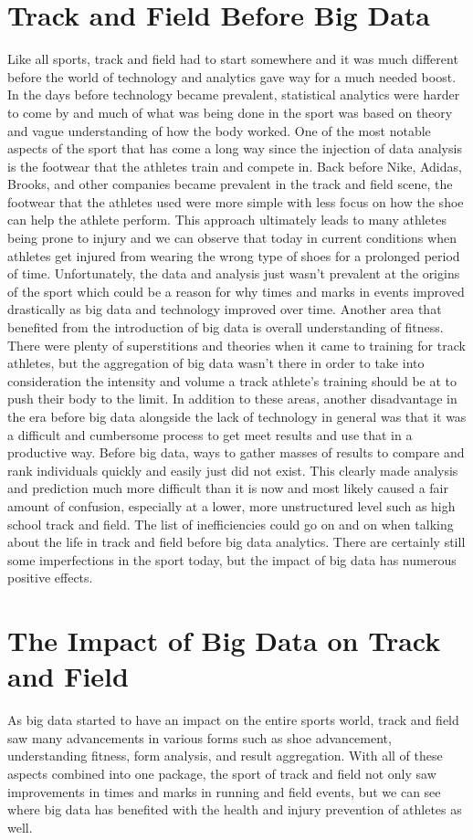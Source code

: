 \documentclass[sigconf]{acmart}
\begin{document}
\section{Track and Field Before Big Data}
Like all sports, track and field had to start somewhere and it was much different before the world of technology and analytics gave way for a much needed boost. In the days before technology became prevalent, statistical analytics were harder to come by and much of what was being done in the sport was based on theory and vague understanding of how the body worked. One of the most notable aspects of the sport that has come a long way since the injection of data analysis is the footwear that the athletes train and compete in. Back before Nike, Adidas, Brooks, and other companies became prevalent in the track and field scene, the footwear that the athletes used were more simple with less focus on how the shoe can help the athlete perform. This approach ultimately leads to many athletes being prone to injury and we can observe that today in current conditions when athletes get injured from wearing the wrong type of shoes for a prolonged period of time. Unfortunately, the data and analysis just wasn't prevalent at the origins of the sport which could be a reason for why times and marks in events improved drastically as big data and technology improved over time. Another area that benefited from the introduction of big data is overall understanding of fitness. There were plenty of superstitions and theories when it came to training for track athletes, but the aggregation of big data wasn't there in order to take into consideration the intensity and volume a track athlete's training should be at to push their body to the limit. In addition to these areas, another disadvantage in the era before big data alongside the lack of technology in general was that it was a difficult and cumbersome process to get meet results and use that in a productive way. Before big data, ways to gather masses of results to compare and rank individuals quickly and easily just did not exist. This clearly made analysis and prediction much more difficult than it is now and most likely caused a fair amount of confusion, especially at a lower, more unstructured level such as high school track and field. The list of inefficiencies could go on and on when talking about the life in track and field before big data analytics. There are certainly still some imperfections in the sport today, but the impact of big data has numerous positive effects.

\section{The Impact of Big Data on Track and Field}
As big data started to have an impact on the entire sports world, track and field saw many advancements in various forms such as shoe advancement, understanding fitness, form analysis, and result aggregation. With all of these aspects combined into one package, the sport of track and field not only saw improvements in times and marks in running and field events, but we can see where big data has benefited with the health and injury prevention of athletes as well.
\end{document}
